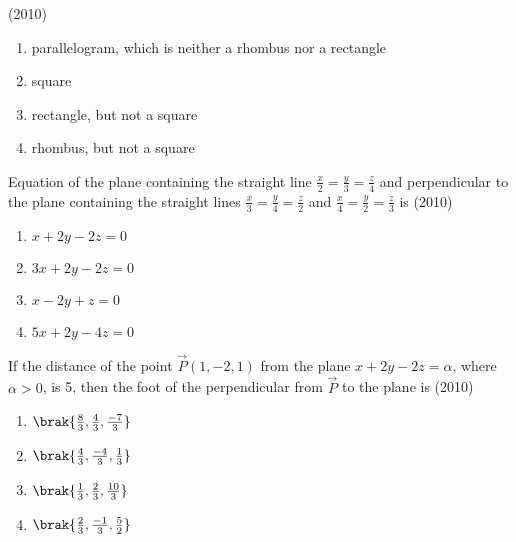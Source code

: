     \hfill{(2010)}
    \begin{enumerate}
    \item parallelogram, which is neither a rhombus nor a rectangle 
    \item square 
    \item rectangle, but not a square
    \item rhombus, but not a square 
    \end{enumerate}
    \item Equation of the plane containing the straight line $\frac{x}{2}=\frac{y}{3}=\frac{z}{4}$ and perpendicular to the plane containing the straight lines $\frac{x}{3}=\frac{y}{4}=\frac{z}{2}$ and $\frac{x}{4}=\frac{y}{2}=\frac{z}{3}$ is 
    \hfill{(2010)}
    \begin{enumerate}
    \item $x+2y-2z=0$
    \item $3x+2y-2z=0$
    \item $x-2y+z=0$
    \item $5x+2y-4z=0$
    \end{enumerate}
    \item If the distance of the point $\vec{P}(1,-2,1)$ from the plane $x+2y-2z=\alpha$, where $\alpha>0$, is 5, then the foot of the perpendicular from $\vec{P}$ to the plane is
    \hfill{(2010)}
    \begin{enumerate}
    \item $\brak{\frac{8}{3}, \frac{4}{3}, \frac{-7}{3}}$
    \item $\brak{\frac{4}{3}, \frac{-4}{3}, \frac{1}{3}}$
    \item $\brak{\frac{1}{3}, \frac{2}{3}, \frac{10}{3}}$
    \item $\brak{\frac{2}{3}, \frac{-1}{3}, \frac{5}{2}}$
    \end{enumerate}



